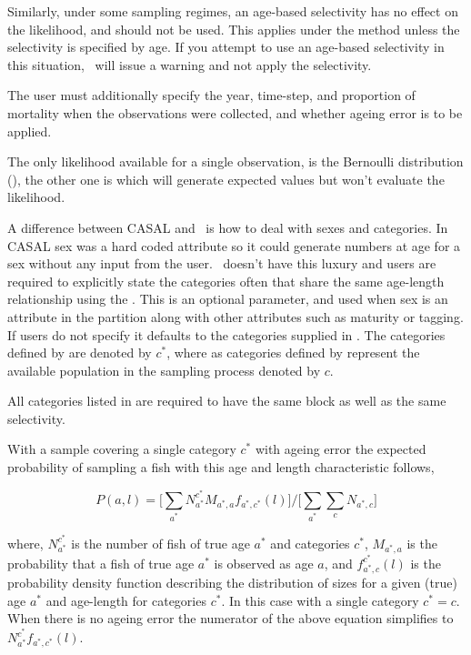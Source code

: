 Similarly, under some sampling regimes, an age-based selectivity has no effect on the likelihood, and should not be used. This applies under the  method unless the selectivity is specified by age. If you attempt to use an age-based selectivity in this situation, \CNAME\ will issue a warning and not apply the selectivity. 

The user must additionally specify the year, time-step, and proportion of mortality when the observations were collected, and whether ageing error is to be applied. 

The only likelihood available for a single observation, is the Bernoulli distribution (), the other one is  which will generate expected values but won't evaluate the likelihood.


A difference between CASAL and \CNAME\ is how to deal with sexes and categories. In CASAL sex was a hard coded attribute so it could generate numbers at age for a sex without any input from the user. \CNAME\ doesn't have this luxury and users are required to explicitly state the categories often that share the same age-length relationship using the . This is an optional parameter, and used when sex is an attribute in the partition along with other attributes such as maturity or tagging. If users do not specify  it defaults to the categories supplied in . The categories defined by  are denoted by \(c^*\), where as categories defined by  represent the available population in the sampling process denoted by \(c\).

All categories listed in  are required to have the same  block as well as the same selectivity.


With a  sample covering a single category \(c^*\) with ageing error the expected probability of sampling a fish with this age and length characteristic follows,

\[
P(a,l) = \bigg[\sum_{a^*} N^{c^*}_{a^*}M_{a^*,a}f_{a^*,c^*}(l)\bigg] / \bigg[\sum_{a^*}\sum_{c} N_{a^*,c}\bigg]
\]

where, \(N^{c^*}_{a^*}\) is the number of fish of true age \(a^*\) and categories \(c^*\), \(M_{a^*,a}\) is the probability that a fish of true age \(a^*\) is observed as age \(a\), and \(f^{c^*}_{a^*,c}(l)\) is the probability density function describing the distribution of sizes for a given (true) age \(a^*\) and age-length for categories \(c^*\). In this case with a single category \(c^* = c\). When there is no ageing error the numerator of the above equation simplifies to \(N^{c^*}_{a^*}f_{a^*,c^*}(l)\).

